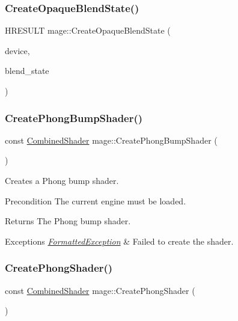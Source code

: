 \subsubsection{\texorpdfstring{Create\+Opaque\+Blend\+State()}{CreateOpaqueBlendState()}}
{\footnotesize\ttfamily H\+R\+E\+S\+U\+LT mage\+::\+Create\+Opaque\+Blend\+State (\begin{DoxyParamCaption}\item[{I\+D3\+D11\+Device2 $\ast$}]{device,  }\item[{I\+D3\+D11\+Blend\+State $\ast$$\ast$}]{blend\+\_\+state }\end{DoxyParamCaption})}

\hypertarget{namespacemage_aa1e787fd000a814765d650fc6a42ff9c}{}\label{namespacemage_aa1e787fd000a814765d650fc6a42ff9c} 
\subsubsection{\texorpdfstring{Create\+Phong\+Bump\+Shader()}{CreatePhongBumpShader()}}
{\footnotesize\ttfamily const \hyperlink{structmage_1_1_combined_shader}{Combined\+Shader} mage\+::\+Create\+Phong\+Bump\+Shader (\begin{DoxyParamCaption}{ }\end{DoxyParamCaption})}

Creates a Phong bump shader.

\begin{DoxyPrecond}{Precondition}
The current engine must be loaded. 
\end{DoxyPrecond}
\begin{DoxyReturn}{Returns}
The Phong bump shader. 
\end{DoxyReturn}

\begin{DoxyExceptions}{Exceptions}
{\em \hyperlink{structmage_1_1_formatted_exception}{Formatted\+Exception}} & Failed to create the shader. \\
\hline
\end{DoxyExceptions}
\hypertarget{namespacemage_a7af1e9f18ad4c1967b6da578b5f6ba96}{}\label{namespacemage_a7af1e9f18ad4c1967b6da578b5f6ba96} 
\subsubsection{\texorpdfstring{Create\+Phong\+Shader()}{CreatePhongShader()}}
{\footnotesize\ttfamily const \hyperlink{structmage_1_1_combined_shader}{Combined\+Shader} mage\+::\+Create\+Phong\+Shader (\begin{DoxyParamCaption}{ }\end{DoxyParamCaption})}

